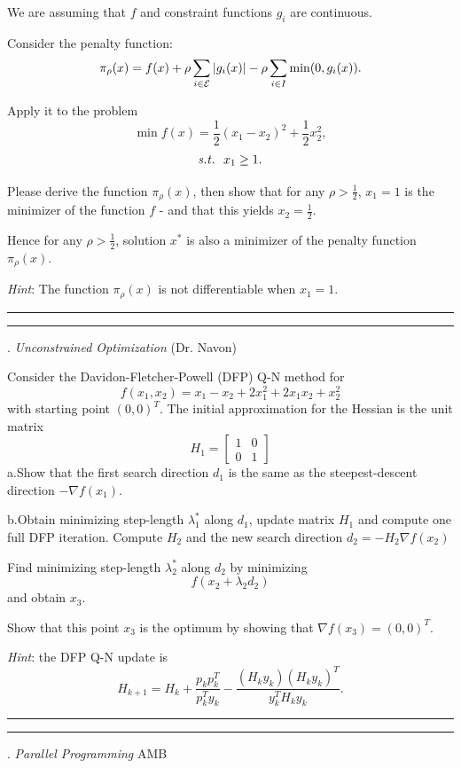 \documentclass [11point]{article}
\begin{document}
We are assuming that $f$ and constraint functions $g_i$ are continuous.

Consider the penalty function:
$$\pi_{\rho}(x)=f(x)+\rho\sum_{i\in \cal E}|g_i(x)|-\rho\sum_{i\in I} \min(0,g_i(x)).$$

Apply it to the problem
$$ \min f(x)=\frac{1}{2}(x_1-x_2)^2 +\frac{1}{2}x_2^2,$$
$${\it s.t. }~~ x_1\geq 1.$$

Please derive the function $\pi_{\rho}(x)$, then show that for any $\rho>\frac{1}{2}$, $x_1=1$ is the minimizer of the function $f$ - and that this yields $x_2=\frac{1}{2}$.

Hence for any $\rho >\frac{1}{2}$, solution $x^*$ is also a minimizer of the penalty function $\pi_{\rho}(x)$.\bigskip

\textit{Hint}: The function $\pi_{\rho}(x)$ is not differentiable when $x_1=1$.


\bigskip 
\hrule

\pagebreak
\hrule
{}. \textit{Unconstrained Optimization} (Dr. Navon)
\bigskip

Consider the Davidon-Fletcher-Powell (DFP)
Q-N method for
$$f(x_1,x_2) = x_1-x_2 +2x_1^2 +2x_1x_2 +x_2^2 $$
with starting point $(0,0)^T$. The initial approximation
for the Hessian is
the unit matrix$$H_1 = \left[ \begin{array}{cc}
  1 & 0  \\
  0 & 1   \end{array} \right]
$$
a.\quad Show that the first search direction $d_1$ is the same as the steepest-descent direction $-\nabla f(x_1) $.
\medskip

b.\quad Obtain minimizing step-length $\lambda ^{\ast} _1$ along $d_1$,
update matrix $H_1$ and compute one full DFP iteration. Compute
$H_2$ and the new search direction $d_2 = -H_2 \nabla f(x_2) $
\medskip

Find minimizing step-length $\lambda ^{\ast} _2$ along $d_2$ by minimizing
$$f(x_2 + \lambda _2 d_2 ) $$
and obtain $x_3$.

\medskip

Show that this point $x_3$ is the optimum by showing
that $\nabla f(x_3) =(0,0)^T$.

\bigskip
\textit{Hint}: the DFP Q-N update is
$$H_{k+1} = H_k + \frac{p_kp_k^T}{p_k^Ty_k} -\frac{(H_ky_k)(H_ky_k)^T}{y_k^TH_ky_k}. $$


\bigskip 
\hrule 



\pagebreak
\hrule 
{}. \textit{Parallel Programming} AMB
\bigskip
\end{document}
